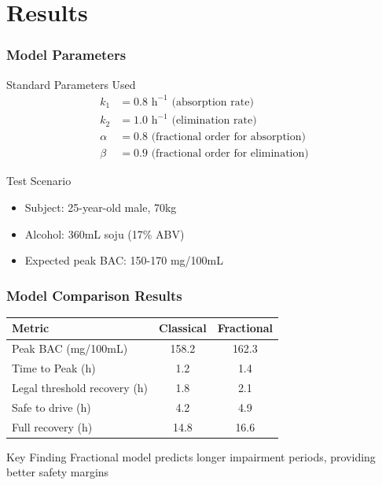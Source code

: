 \documentclass{beamer}
\begin{document}
\section{Results}

\begin{frame}
\frametitle{Model Parameters}
\begin{block}{Standard Parameters Used}
\begin{align}
k_1 &= 0.8 \text{ h}^{-1} \text{ (absorption rate)} \\
k_2 &= 1.0 \text{ h}^{-1} \text{ (elimination rate)} \\
\alpha &= 0.8 \text{ (fractional order for absorption)} \\
\beta &= 0.9 \text{ (fractional order for elimination)}
\end{align}
\end{block}

\begin{block}{Test Scenario}
\begin{itemize}
    \item Subject: 25-year-old male, 70kg
    \item Alcohol: 360mL soju (17\% ABV)
    \item Expected peak BAC: 150-170 mg/100mL
\end{itemize}
\end{block}
\end{frame}

\begin{frame}
\frametitle{Model Comparison Results}
\begin{table}[h]
\centering
\begin{tabular}{|l|c|c|}
\hline
\textbf{Metric} & \textbf{Classical} & \textbf{Fractional} \\
\hline
Peak BAC (mg/100mL) & 158.2 & 162.3 \\
\hline
Time to Peak (h) & 1.2 & 1.4 \\
\hline
Legal threshold recovery (h) & 1.8 & 2.1 \\
\hline
Safe to drive (h) & 4.2 & 4.9 \\
\hline
Full recovery (h) & 14.8 & 16.6 \\
\hline
\end{tabular}
\end{table}

\begin{alertblock}{Key Finding}
Fractional model predicts longer impairment periods, providing better safety margins
\end{alertblock}
\end{frame}
\end{document}
